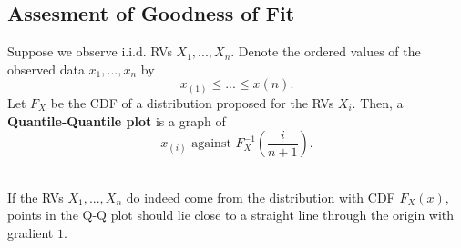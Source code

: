 \subsection{Assesment of Goodness of Fit}

\begin{definition}
    Suppose we observe i.i.d. RVs $X_1,...,X_n$. Denote the ordered values of the observed data $x_1,...,x_n$ by
    \[x_{(1)} \leq ... \leq x{(n)}.\]
  Let $F_X$ be the CDF of a distribution proposed for the RVs $X_i$. Then, a {\bf Quantile-Quantile plot} is a graph of
  \[x_{(i)} \text{ against } F_X^{-1}\left( \frac{i}{n + 1}\right).\]
\end{definition}
$ $ \\
If the RVs $X_1,...,X_n$ do indeed come from the distribution with CDF $F_X(x)$, points in the Q-Q plot should lie close to a straight line through the origin with gradient $1$.
